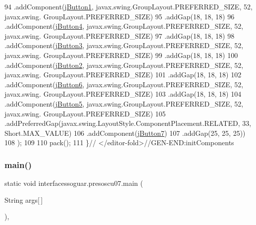 \begin{DoxyCode}
94                 .addComponent(\mbox{\hyperlink{classinterfacessoguar_1_1presoscu07_a32fac137cfd5dc354e4cfa6ee0530f76}{jButton1}}, javax.swing.GroupLayout.PREFERRED\_SIZE, 52, javax.swing.
      GroupLayout.PREFERRED\_SIZE)
95                 .addGap(18, 18, 18)
96                 .addComponent(\mbox{\hyperlink{classinterfacessoguar_1_1presoscu07_a59d84610b52e55806c464f05ac4d1f9a}{jButton4}}, javax.swing.GroupLayout.PREFERRED\_SIZE, 52, javax.swing.
      GroupLayout.PREFERRED\_SIZE)
97                 .addGap(18, 18, 18)
98                 .addComponent(\mbox{\hyperlink{classinterfacessoguar_1_1presoscu07_ab74517a901b30e28dab9f184845d8e00}{jButton3}}, javax.swing.GroupLayout.PREFERRED\_SIZE, 52, javax.swing.
      GroupLayout.PREFERRED\_SIZE)
99                 .addGap(18, 18, 18)
100                 .addComponent(\mbox{\hyperlink{classinterfacessoguar_1_1presoscu07_a35492e43d1e9d8728a881acf30bff4c3}{jButton2}}, javax.swing.GroupLayout.PREFERRED\_SIZE, 52, javax.swing.
      GroupLayout.PREFERRED\_SIZE)
101                 .addGap(18, 18, 18)
102                 .addComponent(\mbox{\hyperlink{classinterfacessoguar_1_1presoscu07_a43f487b75785b57a2b918d23dfc94611}{jButton6}}, javax.swing.GroupLayout.PREFERRED\_SIZE, 52, javax.swing.
      GroupLayout.PREFERRED\_SIZE)
103                 .addGap(18, 18, 18)
104                 .addComponent(\mbox{\hyperlink{classinterfacessoguar_1_1presoscu07_a235597181f1514e6ad0aa24146a9ea4a}{jButton5}}, javax.swing.GroupLayout.PREFERRED\_SIZE, 52, javax.swing.
      GroupLayout.PREFERRED\_SIZE)
105                 .addPreferredGap(javax.swing.LayoutStyle.ComponentPlacement.RELATED, 33, Short.MAX\_VALUE)
106                 .addComponent(\mbox{\hyperlink{classinterfacessoguar_1_1presoscu07_a3f67db575069b29512c7ce7b0f2e8062}{jButton7}})
107                 .addGap(25, 25, 25))
108         );
109 
110         pack();
111     \}\textcolor{comment}{// </editor-fold>//GEN-END:initComponents}
\end{DoxyCode}
\mbox{\label{classinterfacessoguar_1_1presoscu07_a1e62109b02970a7d7621d3615c668932}} 
\subsubsection{\texorpdfstring{main()}{main()}}
{\footnotesize\ttfamily static void interfacessoguar.\+presoscu07.\+main (\begin{DoxyParamCaption}\item[{String}]{args\mbox{[}$\,$\mbox{]} }\end{DoxyParamCaption})\hspace{0.3cm}{\ttfamily [inline]}, {\ttfamily [static]}}


